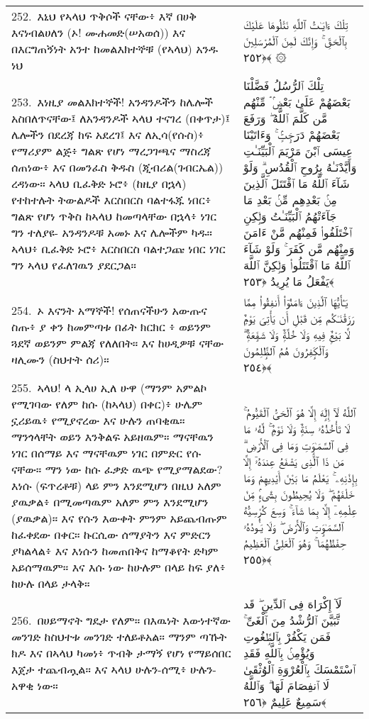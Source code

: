 \documentclass[11pt,a4paper,oneside]{article}%
\newcommand{\mytextarabic}[1]{\textarabic{ #1 \flushright}}
\begin{document}
\begin{longtable}{%
  @{}
    p{}
  @{~~~}
    p{}
    @{}
}
252.\ እኒህ የኣላህ ጥቅሶች ናቸው፥ እኛ በሀቅ እናነብልሀለን (ኦ! ሙሐመድ(ሠአወሰ)) እና በእርግጠኝነት አንተ ከመልእክተኞቹ (የኣላህ) አንዱ ነህ &  \mytextarabic{ تِلْكَ ءَايَـٰتُ ٱللَّهِ نَتْلُوهَا عَلَيْكَ بِٱلْحَقِّ ۚ وَإِنَّكَ لَمِنَ ٱلْمُرْسَلِينَ ﴿٢٥٢﴾ ۞}\\
253.\ እነዚያ መልእክተኞች! አንዳንዶችን ከሌሎች አስበለጥናቸው፤ ለአንዳንዶች ኣላህ ተናገረ (በቀጥታ)፤ ሌሎችን በደረጃ ከፍ አደረገ፤ እና ለኢሳ(የሱስ)፥ የማሪያም ልጅ፥ ግልጽ የሆነ ማረጋገጫና ማስረጃ ሰጠነው፥ እና በመንፈስ ቅዱስ (ጂብሪል(ገብርኤል)) ረዳነው። ኣላህ ቢፈቅድ ኑሮ፥ (ከዚያ በኋላ) የተከተሉት ትውልዶች እርስበርስ ባልተፋጁ ነበር፥ ግልጽ የሆነ ጥቅስ ከኣላህ ከመጣላቸው በኋላ፥ ነገር ግን ተለያዩ- አንዳንዶቹ አመኑ እና ሌሎችም ካዱ። ኣላህ፥ ቢፈቅድ ኑሮ፥ እርስበርስ ባልተጋጩ ነበር ነገር ግን ኣላህ የፈለገዉን ያደርጋል። &  \mytextarabic{  تِلْكَ ٱلرُّسُلُ فَضَّلْنَا بَعْضَهُمْ عَلَىٰ بَعْضٍۢ ۘ مِّنْهُم مَّن كَلَّمَ ٱللَّهُ ۖ وَرَفَعَ بَعْضَهُمْ دَرَجَٟتٍۢ ۚ وَءَاتَيْنَا عِيسَى ٱبْنَ مَرْيَمَ ٱلْبَيِّنَـٰتِ وَأَيَّدْنَـٰهُ بِرُوحِ ٱلْقُدُسِ ۗ وَلَوْ شَآءَ ٱللَّهُ مَا ٱقْتَتَلَ ٱلَّذِينَ مِنۢ بَعْدِهِم مِّنۢ بَعْدِ مَا جَآءَتْهُمُ ٱلْبَيِّنَـٰتُ وَلَٟكِنِ ٱخْتَلَفُوا۟ فَمِنْهُم مَّنْ ءَامَنَ وَمِنْهُم مَّن كَفَرَ ۚ وَلَوْ شَآءَ ٱللَّهُ مَا ٱقْتَتَلُوا۟ وَلَٟكِنَّ ٱللَّهَ يَفْعَلُ مَا يُرِيدُ ﴿٢٥٣﴾}\\
254.\ ኦ እናንት አማኞች! የሰጠናችሁን አውጡና ስጡ፥ ያ ቀን ከመምጣቱ በፊት ክርክር ፥ ወይንም ጓደኛ ወይንም ምልጃ የለለበት። እና ከሀዲዎቹ ናቸው ዛሊሙን (ስህተት ሰሪ)። &  \mytextarabic{يَـٰٓأَيُّهَا ٱلَّذِينَ ءَامَنُوٓا۟ أَنفِقُوا۟ مِمَّا رَزَقْنَـٰكُم مِّن قَبْلِ أَن يَأْتِىَ يَوْمٌۭ لَّا بَيْعٌۭ فِيهِ وَلَا خُلَّةٌۭ وَلَا شَفَٟعَةٌۭ ۗ وَٱلْكَٟفِرُونَ هُمُ ٱلظَّٟلِمُونَ ﴿٢٥٤﴾}\\
255.\ ኣላህ! ላ ኢላሀ ኢለ ሁዋ (ማንም አምልኮ የሚገባው የለም ከሱ (ከኣላህ) በቀር)፥ ሁሌም ኗሪይዉ፥ የሚያኖረው እና ሁሉን ጠባቂዉ። ማንጎላቸት ወይን እንቅልፍ አይዘዉም። ማናቸዉን ነገር በሰማይ እና ማናቸዉም ነገር በምድር የሱ ናቸው። ማን ነው ከሱ ፈቃድ ዉጭ የሚያማልደው? እነሱ (ፍጥረቶቹ) ላይ ምን እንደሚሆን በዚህ አለም ያዉቃል፥ በሚመጣዉም አለም ምን እንደሚሆን (ያዉቃል)። እና የሱን እውቀት ምንም አይጨብጡም ከፈቀደው በቀር። ኩርሲው ሰማያትን እና ምድርን ያካልላል፥ እና እነሱን ከመጠበቅና ከማቆየት ድካም አይሰማዉም። እና እሱ ነው ከሁሉም በላይ ከፍ ያለ፥ ከሁሉ በላይ ታላቅ። &  \mytextarabic{ٱللَّهُ لَآ إِلَٟهَ إِلَّا هُوَ ٱلْحَىُّ ٱلْقَيُّومُ ۚ لَا تَأْخُذُهُۥ سِنَةٌۭ وَلَا نَوْمٌۭ ۚ لَّهُۥ مَا فِى ٱلسَّمَـٰوَٟتِ وَمَا فِى ٱلْأَرْضِ ۗ مَن ذَا ٱلَّذِى يَشْفَعُ عِندَهُۥٓ إِلَّا بِإِذْنِهِۦ ۚ يَعْلَمُ مَا بَيْنَ أَيْدِيهِمْ وَمَا خَلْفَهُمْ ۖ وَلَا يُحِيطُونَ بِشَىْءٍۢ مِّنْ عِلْمِهِۦٓ إِلَّا بِمَا شَآءَ ۚ وَسِعَ كُرْسِيُّهُ ٱلسَّمَـٰوَٟتِ وَٱلْأَرْضَ ۖ وَلَا يَـُٔودُهُۥ حِفْظُهُمَا ۚ وَهُوَ ٱلْعَلِىُّ ٱلْعَظِيمُ ﴿٢٥٥﴾}\\
256.\ በሀይማኖት ግዴታ የለም። በእዉነት እውነተኛው መንገድ ከስህተቱ መንገድ ተለይቶአል። ማንም ጣኹት ክዶ እና በኣላህ ካመነ፥ ጥብቅ ታማኝ የሆነ የማይሰበር እጀታ ተጨብጧል። እና ኣላህ ሁሉን-ሰሚ፥ ሁሉን-አዋቂ ነው። &  \mytextarabic{لَآ إِكْرَاهَ فِى ٱلدِّينِ ۖ قَد تَّبَيَّنَ ٱلرُّشْدُ مِنَ ٱلْغَىِّ ۚ فَمَن يَكْفُرْ بِٱلطَّٟغُوتِ وَيُؤْمِنۢ بِٱللَّهِ فَقَدِ ٱسْتَمْسَكَ بِٱلْعُرْوَةِ ٱلْوُثْقَىٰ لَا ٱنفِصَامَ لَهَا ۗ وَٱللَّهُ سَمِيعٌ عَلِيمٌ ﴿٢٥٦﴾}\\

\end{longtable}
\end{document}
